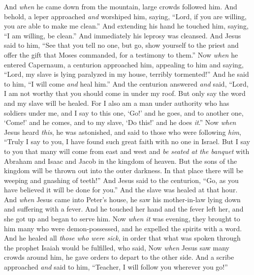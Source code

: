 \begin{biblechapter} %
 And \textit{when} he came down from the mountain, large crowds followed him.
\verse And behold, a leper approached \textit{and} worshiped him, saying, “Lord, if you are willing, you are able to make me clean.”
\verse And extending his hand he touched him, saying, “I am willing, be clean.” And immediately his leprosy was cleansed.
\verse And Jesus said to him, “See that you tell no one, but go, show yourself to the priest and offer the gift that Moses commanded, for a testimony to them.”
 Now \textit{when} he entered Capernaum, a centurion approached him, appealing to him
\verse and saying, “Lord, my slave is lying paralyzed in my house, terribly tormented!”
\verse And he said to him, “I will come \textit{and} heal him.”
\verse And the centurion answered \textit{and} said, “Lord, I am not worthy that you should come in under my roof. But only say the word and my slave will be healed.
\verse For I also am a man under authority who has soldiers under me, and I say to this one, ‘Go!’ and he goes, and to another one, ‘Come!’ and he comes, and to my slave, ‘Do this!’ and he does \textit{it}.”
\verse Now \textit{when} Jesus heard \textit{this}, he was astonished, and said to those who were following \textit{him}, “Truly I say to you, I have found such great faith with no one in Israel.
\verse But I say to you that many will come from east and west and \textit{be seated at the banquet} with Abraham and Isaac and Jacob in the kingdom of heaven.
\verse But the sons of the kingdom will be thrown out into the outer darkness. In that place there will be weeping and gnashing of teeth!”
\verse And Jesus said to the centurion, “Go, as you have believed it will be done for you.” And the slave was healed at that hour.
 And \textit{when} Jesus came into Peter’s house, he saw his mother-in-law lying down and suffering with a fever.
\verse And he touched her hand and the fever left her, and she got up and began to serve him.
\verse Now \textit{when it} was evening, they brought to him many who were demon-possessed, and he expelled the spirits with a word. And he healed all \textit{those who were sick},
\verse in order that what was spoken through the prophet Isaiah would be fulfilled, who said,
 Now \textit{when} Jesus saw many crowds around him, he gave orders to depart to the other side.
\verse And a scribe approached \textit{and} said to him, “Teacher, I will follow you wherever you go!”

\end{biblechapter}

